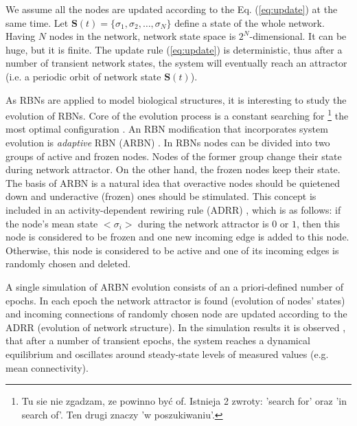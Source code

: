 \documentclass[procedia]{easychair}
\begin{document}
	We assume all the nodes are updated according to the Eq. (\ref{eq:update}) at the same time. Let $\boldsymbol{S}(t)=\{\sigma_1, \sigma_2, \ldots, \sigma_N\}$ define a state of the whole network. 
	Having $N$ nodes in the network, network state space is $2^N$-dimensional. It can be huge, but it is finite. The update rule (\ref{eq:update}) is deterministic, thus after a number of transient network states, the system will eventually reach an attractor (i.e. a periodic orbit of network state $\boldsymbol{S}(t)$). 
	
	As RBNs are applied to model biological structures, it is interesting to study the evolution of RBNs. Core of the evolution process is a constant searching for \footnote{Tu sie nie zgadzam, ze powinno być of. Istnieja 2 zwroty: 'search for' oraz 'in search of'. Ten drugi znaczy 'w poszukiwaniu'.} the most optimal configuration \cite{aldana2003boolean,sole1996extinction,zimmermann2004coevolution}. 
	An RBN modification that incorporates system evolution is {\it adaptive} RBN (ARBN) \cite{mlb,soc,haruna14relationship,Gorski2016}. 
	In RBNs nodes can be divided into two groups of active and frozen nodes. Nodes of the former group change their state during network attractor. On the other hand, the frozen nodes keep their state. 
	The basis of ARBN is a natural idea that overactive nodes should be quietened down and underactive (frozen) ones should be stimulated. This concept is included in an activity-dependent rewiring rule (ADRR) \cite{bornholdt2000topological}, which is as follows: 
	if the node’s mean state $<\sigma_i>$ during the network attractor is $0$ or $1$, then this node
	is considered to be frozen and one new incoming edge is
	added to this node. Otherwise, this node is considered to be active and one of
	its incoming edges is randomly chosen and deleted.
	
	A single simulation of ARBN evolution consists of an a priori-defined number of epochs. In each epoch the network attractor is found (evolution of nodes' states) and incoming connections of randomly chosen node are updated according to the ADRR (evolution of network structure). 
	In the simulation results it is observed \cite{mlb,Gorski2016}, that after a number of transient epochs, the system reaches a dynamical equilibrium and oscillates around steady-state levels of measured values (e.g. mean connectivity). 
	
\end{document}
